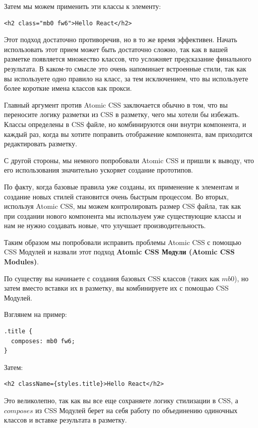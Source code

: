 Затем мы можем применить эти классы к элементу:

\begin{lstlisting}
<h2 class="mb0 fw6">Hello React</h2>
\end{lstlisting}

Этот подход достаточно противоречив, но в то же время эффективен. Начать использовать этот прием может быть достаточно сложно, так как в вашей разметке появляется множество классов, что усложняет предсказание финального результата. В каком-то смысле это очень напоминает встроенные стили, так как вы используете одно правило на класс, за тем исключением, что вы используете более короткие имена классов как прокси.

Главный аргумент против Atomic CSS заключается обычно в том, что вы переносите логику разметки из CSS в разметку, чего мы хотели бы избежать. Классы определены в CSS файле, но комбинируются они внутри компонента, и каждый раз, когда вы хотите поправить отображение компонента, вам приходится редактировать разметку.

С другой стороны, мы немного попробовали Atomic CSS и пришли к выводу, что его использования значительно ускоряет создание прототипов.

По факту, когда базовые правила уже созданы, их применение к элементам и создание новых стилей становится очень быстрым процессом. Во вторых, используя Atomic CSS, мы можем контролировать размер CSS файла, так как при создании нового компонента мы используем уже существующие классы и нам не нужно создавать новые, что улучшает производительность.

Таким образом мы попробовали исправить проблемы Atomic CSS с помощью CSS Модулей и назвали этот подход \textbf{Atomic CSS Модули (Atomic CSS Modules)}.

По существу вы начинаете с создания базовых CSS классов (таких как $mb0$), но затем вместо вставки их в разметку, вы комбинируете их с помощью CSS Модулей.

Взглянем на пример:

\begin{lstlisting}
.title {
  composes: mb0 fw6;
}
\end{lstlisting}

Затем:

\begin{lstlisting}
<h2 className={styles.title}>Hello React</h2>
\end{lstlisting}

Это великолепно, так как вы все еще сохраняете логику стилизации в CSS, а $composes$ из CSS Модулей берет на себя работу по объединению одиночных классов и вставке результата в разметку.

